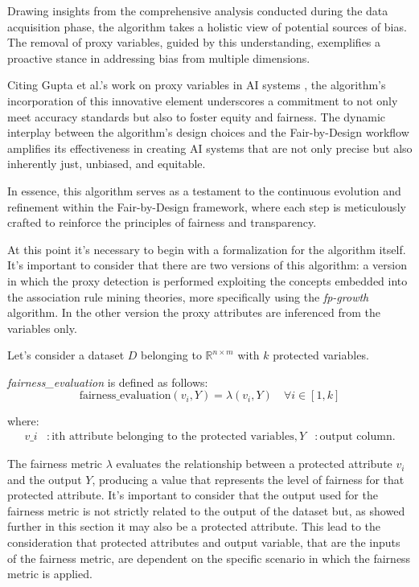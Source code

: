 Drawing insights from the comprehensive analysis conducted during the data acquisition phase, the algorithm takes a holistic view of potential sources of bias. The removal of proxy variables, guided by this understanding, exemplifies a proactive stance in addressing bias from multiple dimensions.

Citing Gupta et al.'s work on proxy variables in AI systems \cite{Gupta2018ProxyF}, the algorithm's incorporation of this innovative element underscores a commitment to not only meet accuracy standards but also to foster equity and fairness. The dynamic interplay between the algorithm's design choices and the Fair-by-Design workflow amplifies its effectiveness in creating AI systems that are not only precise but also inherently just, unbiased, and equitable.

In essence, this algorithm serves as a testament to the continuous evolution and refinement within the Fair-by-Design framework, where each step is meticulously crafted to reinforce the principles of fairness and transparency.

At this point it's necessary to begin with a formalization for the algorithm itself. It's important to consider that there are two versions of this algorithm: a version in which the proxy detection is performed exploiting the concepts embedded into the association rule mining theories, more specifically using the \emph{fp-growth} algorithm. In the other version the proxy attributes are inferenced from the variables only.

Let's consider a dataset \( D \) belonging to \( \mathbb{R}^{n \times m} \) with \( k \) protected variables.

\textit{fairness\_evaluation} is defined as follows:
\[
\text{fairness\_evaluation}(v_i, Y) = \lambda(v_i, Y) \quad \forall i \in [1, k]
\]

where:
\begin{align*}
v\_i & : \text{ith attribute belonging to the protected variables}, Y & : \text{output column}.
\end{align*}

The fairness metric \( \lambda \) evaluates the relationship between a protected attribute \( v_i \) and the output \( Y \), producing a value that represents the level of fairness for that protected attribute. It's important to consider that the output used for the fairness metric is not strictly related to the output of the dataset but, as showed further in this section it may also be a protected attribute. This lead to the consideration that protected attributes and output variable, that are the inputs of the fairness metric, are dependent on the specific scenario in which the fairness metric is applied.

